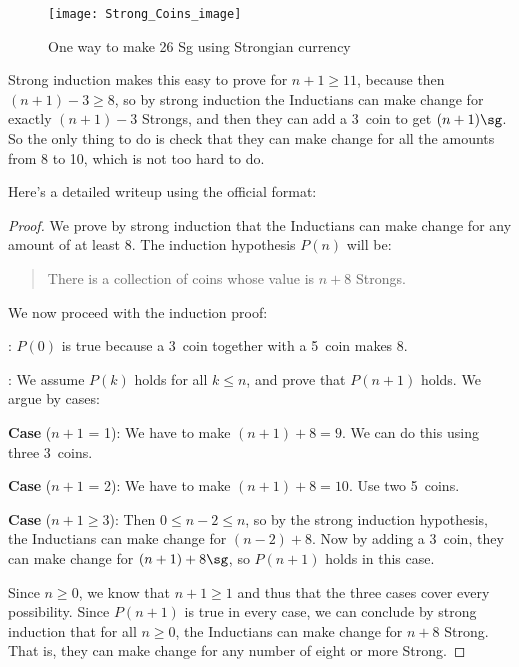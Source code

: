 \begin{figure}

\texttt{[image: Strong\_Coins\_image]}
\caption{One way to make 26 Sg using Strongian currency}
\label{strong_coins}
\end{figure}

Strong induction makes this easy to prove for $n+1 \ge 11$, because then
$(n+1)-3 \ge 8$, so by strong induction the Inductians can make change for
exactly $(n+1)-3$ Strongs, and then they can add a 3\sg\ coin to get
$(n+1)\sg$.  So the only thing to do is check that they can make change
for all the amounts from 8 to 10\sg, which is not too hard to do.

Here's a detailed writeup using the official format:

\begin{proof}

We prove by strong induction that the Inductians can make change for
any amount of at least 8\sg.  The induction hypothesis $P(n)$ will be:
\begin{quote}
There is a collection of coins whose value is $n+8$ Strongs.
\end{quote}

We now proceed with the induction proof:

: $P(0)$ is true because a 3\sg\ coin together with
a 5\sg\ coin makes 8\sg.

:  We assume $P(k)$ holds for all $k \leq n$, and
prove that $P(n+1)$ holds.  We argue by cases:

\textbf{Case} ($n+1$ = 1): We have to make $(n+1) +8 =9$\sg.  We can do this using three 3\sg\ coins.

\textbf{Case} ($n+1$ = 2): We have to make $(n+1) +8 =10$\sg.  Use two
5\sg\ coins.

\textbf{Case} ($n+1 \geq 3$): Then $0 \leq n - 2 \leq n$, so by the
strong induction hypothesis, the Inductians can make change for
$(n-2)+8$\sg.  Now by adding a 3\sg\ coin, they can make change for
$(n+1)+8\sg$, so $P(n+1)$ holds in this case.

Since $n \ge 0$, we know that $n + 1 \ge 1$ and thus that the three
cases cover every possibility.  Since $P(n+1)$ is true in every case,
we can conclude by strong induction that for all $n \ge 0$, the
Inductians can make change for $n+8$ Strong.  That is, they can make
change for any number of eight or more Strong.
\end{proof}


